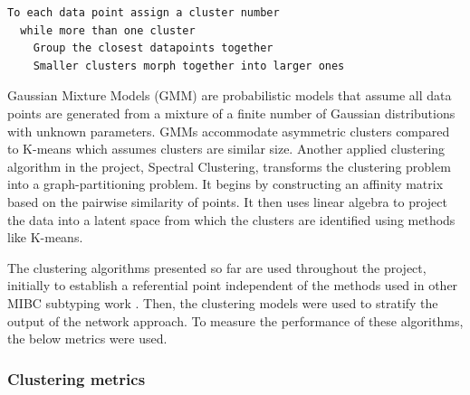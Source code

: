 \begin{lstlisting}[caption={Agglomerative hierarchical clustering pseudocode}, label={code:agg_clustering}]
  To each data point assign a cluster number
  while more than one cluster
    Group the closest datapoints together 
    Smaller clusters morph together into larger ones
\end{lstlisting} 

Gaussian Mixture Models (GMM) are probabilistic models that assume all data points are generated from a mixture of a finite number of Gaussian distributions with unknown parameters. GMMs accommodate asymmetric clusters compared to K-means which assumes clusters are similar size. Another applied clustering algorithm in the project, Spectral Clustering, transforms the clustering problem into a graph-partitioning problem. It begins by constructing an affinity matrix based on the pairwise similarity of points. It then uses linear algebra to project the data into a latent space from which the clusters are identified using methods like K-means.

The clustering algorithms presented so far are used throughout the project, initially to establish a referential point independent of the methods used in other MIBC subtyping work \cite{Robertson2017-mg, Marzouka2018-ge, Kamoun2020-tj}. Then, the clustering models were used to stratify the output of the network approach. To measure the performance of these algorithms, the below metrics were used.


\subsubsection*{Clustering metrics} \label{s:lit:clustering_metrics}

